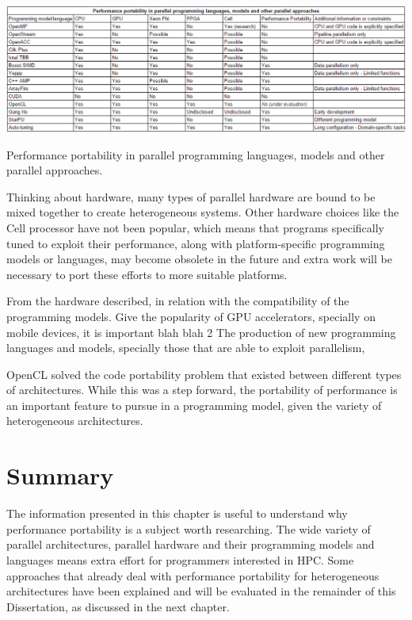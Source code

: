 \begin{table}[!h]
\begin{center}
\centerline{\includegraphics[width=\columnwidth]{img/portability}}
\caption{Performance portability in parallel programming languages, models and other parallel approaches.}
\label{t:portability}
\end{center}
\end{table}

Thinking about hardware, many types of parallel hardware are bound to be mixed together to create heterogeneous systems. Other hardware choices like the Cell processor have not been popular, which means that programs specifically tuned to exploit their performance, along with platform-specific programming models or languages, may become obsolete in the future and extra work will be necessary to port these efforts to more suitable platforms.

From the hardware described, in relation with the compatibility of the programming models. Give the popularity of GPU accelerators, specially on mobile devices, it is important blah blah
2
The production of new programming languages and models, specially those that are able to exploit parallelism, %

OpenCL solved the code portability problem that existed between different types of architectures. While this was a step forward, the portability of performance is an important feature to pursue in a programming model, given the variety of heterogeneous architectures.

\section{Summary}

The information presented in this chapter is useful to understand why performance portability is a subject worth researching. The wide variety of parallel architectures, parallel hardware and their programming models and languages means extra effort for programmers interested in HPC. Some approaches that already deal with performance portability for heterogeneous architectures have been explained and will be evaluated in the remainder of this Dissertation, as discussed in the next chapter.
